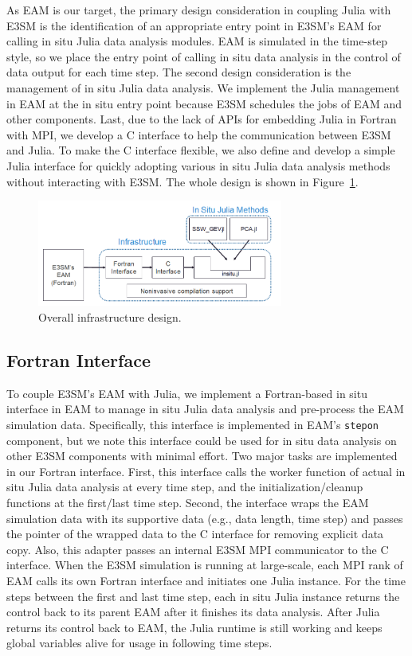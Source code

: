 \documentclass{juliacon}
\begin{document}
As EAM is our target, the primary design consideration in coupling Julia with E3SM is the identification of an appropriate entry point in E3SM's EAM for calling in situ Julia data analysis modules. EAM is simulated in the time-step style, so we place the entry point of calling in situ data analysis in the control of data output for each time step. The second design consideration is the management of in situ Julia data analysis. We implement the Julia management in EAM at the in situ entry point because E3SM schedules the jobs of EAM and other components. Last, due to the lack of APIs for embedding Julia in Fortran with MPI, we develop a C interface to help the communication between E3SM and Julia. To make the C interface flexible, we also define and develop a simple Julia interface for quickly adopting various in situ Julia data analysis methods without interacting with E3SM. The whole design is shown in Figure~\ref{fig:infra}.


\begin{figure}
    \centering
    \includegraphics[width=\linewidth, height=3.5cm]{figures/infra.png}
    \caption{Overall infrastructure design.}
    \label{fig:infra}
\end{figure}



\subsection{Fortran Interface}



To couple E3SM's EAM with Julia, we implement a Fortran-based in situ interface in EAM to manage in situ Julia data analysis and pre-process the EAM simulation data. Specifically, this interface is implemented in EAM's \texttt{stepon} component, but we note this interface could be used for in situ data analysis on other E3SM components with minimal effort. Two major tasks are implemented in our Fortran interface. First, this interface calls the worker function of actual in situ Julia data analysis at every time step, and the initialization/cleanup functions at the first/last time step. Second, the interface wraps the EAM simulation data with its supportive data (e.g., data length, time step) and passes the pointer of the wrapped data to the C interface for removing explicit data copy. Also, this adapter passes an internal E3SM MPI communicator to the C interface. When the E3SM simulation is running at large-scale, each MPI rank of EAM calls its own Fortran interface and initiates one Julia instance. For the time steps between the first and last time step, each in situ Julia instance returns the control back to its parent EAM after it finishes its data analysis. After Julia returns its control back to EAM, the Julia runtime is still working and keeps global variables alive for usage in following time steps.
\end{document}
